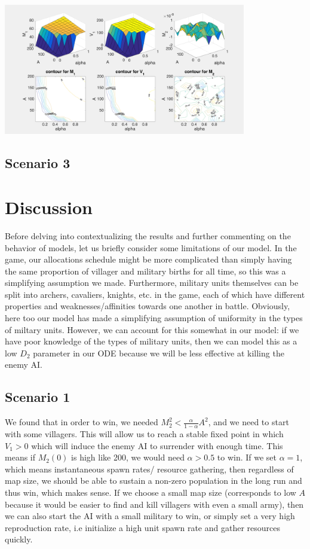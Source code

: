 \documentclass[12pt]{article}
\begin{document}
\begin{center}
\includegraphics[width=300pt]{contour_ext1_part1}
\end{center}
\subsection{Scenario 3}


\section{Discussion}
Before delving into contextualizing the results and further commenting on the behavior of models, let us briefly consider some limitations of our model. In the game, our allocations schedule might be more complicated than simply having the same proportion of villager and military births for all time, so this was a simplifying assumption we made. Furthermore, military units themselves can be split into archers, cavaliers, knights, etc. in the game, each of which have different properties and weaknesses/affinities towards one another in battle. Obviously, here too our model has made a simplifying assumption of uniformity in the types of miltary units. However, we can account for this somewhat in our model: if we have poor knowledge of the types of military units, then we can model this as a low $D_2$ parameter in our ODE because we will be less effective at killing the enemy AI.

\subsection{Scenario 1}
We found that in order to win, we needed $M_2^2 < \frac{\alpha}{1 - \alpha} A^2$, and we need to start with some villagers. This will allow us to reach a stable fixed point in which $V_1 > 0$ which will induce the enemy AI to surrender with enough time. This means if $M_2(0)$ is high like 200, we would need $\alpha > 0.5$ to win. If we set $\alpha = 1$, which means instantaneous spawn rates/ resource gathering, then regardless of map size, we should be able to sustain a non-zero population in the long run and thus win, which makes sense. If we choose a small map size (corresponds to low $A$ because it would be easier to find and kill villagers with even a small army), then we can also start the AI with a small military to win, or simply set a very high reproduction rate, i.e initialize a high unit spawn rate and gather resources quickly. \par
\end{document}
